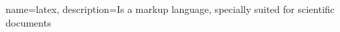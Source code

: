 {
    name=latex,
    description={Is a markup language, specially suited for scientific documents}
}

